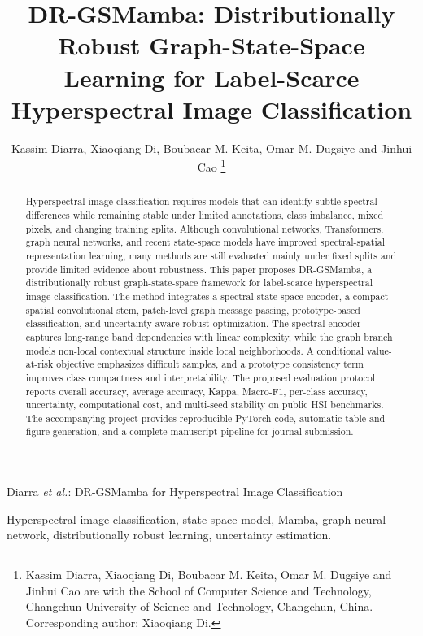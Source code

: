 \documentclass[journal]{IEEEtran}
\title{DR-GSMamba: Distributionally Robust Graph-State-Space Learning for Label-Scarce Hyperspectral Image Classification}
\author{Kassim Diarra, Xiaoqiang Di, Boubacar M. Keita, Omar M. Dugsiye and Jinhui Cao%
\thanks{Kassim Diarra, Xiaoqiang Di, Boubacar M. Keita, Omar M. Dugsiye and Jinhui Cao are with the School of Computer Science and Technology, Changchun University of Science and Technology, Changchun, China. Corresponding author: Xiaoqiang Di.}}
\begin{document}
%
{Diarra \MakeLowercase{\textit{et al.}}: DR-GSMamba for Hyperspectral Image Classification}
\maketitle

\begin{abstract}
Hyperspectral image classification requires models that can identify subtle spectral differences while remaining stable under limited annotations, class imbalance, mixed pixels, and changing training splits. Although convolutional networks, Transformers, graph neural networks, and recent state-space models have improved spectral-spatial representation learning, many methods are still evaluated mainly under fixed splits and provide limited evidence about robustness. This paper proposes DR-GSMamba, a distributionally robust graph-state-space framework for label-scarce hyperspectral image classification. The method integrates a spectral state-space encoder, a compact spatial convolutional stem, patch-level graph message passing, prototype-based classification, and uncertainty-aware robust optimization. The spectral encoder captures long-range band dependencies with linear complexity, while the graph branch models non-local contextual structure inside local neighborhoods. A conditional value-at-risk objective emphasizes difficult samples, and a prototype consistency term improves class compactness and interpretability. The proposed evaluation protocol reports overall accuracy, average accuracy, Kappa, Macro-F1, per-class accuracy, uncertainty, computational cost, and multi-seed stability on public HSI benchmarks. The accompanying project provides reproducible PyTorch code, automatic table and figure generation, and a complete manuscript pipeline for journal submission.
\end{abstract}

\begin{IEEEkeywords}
Hyperspectral image classification, state-space model, Mamba, graph neural network, distributionally robust learning, uncertainty estimation.
\end{IEEEkeywords}









\end{document}
